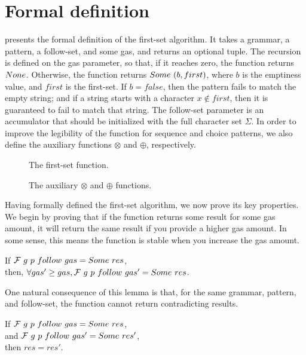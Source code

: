 \section{Formal definition}

 presents
the formal definition of the first-set algorithm.
It takes a grammar, a pattern, a follow-set,
and some gas, and returns an optional tuple.
The recursion is defined on the gas parameter,
so that, if it reaches zero,
the function returns $None$.
Otherwise, the function returns $Some\ (b, first)$,
where $b$ is the emptiness value,
and $first$ is the first-set.
If $b=false$,
then the pattern fails to match the empty string;
and if a string starts with a character
$x \notin first$,
then it is guaranteed to fail to match that string.
The follow-set parameter is an
accumulator that should be initialized with
the full character set $\Sigma$.
In order to improve the legibility
of the function for sequence and choice patterns,
we also define the auxiliary functions $\otimes$ and $\oplus$,
respectively.
\begin{figure}
    \centering
    
    \caption{The first-set function.}
    \label{fig:firstcomp}
\end{figure}
\begin{figure}
    \centering
    
    
    \caption{The auxiliary $\otimes$ and $\oplus$ functions.}
    \label{fig:firstaux}
\end{figure}

Having formally defined the first-set algorithm,
we now prove its key properties.
We begin by proving that if the function returns
some result for some gas amount,
it will return the same result if you provide
a higher gas amount.
In some sense, this means the function is stable
when you increase the gas amount.

\begin{lemma}
If $\mathcal{F}{}\ g\ p\ follow\ gas = Some\ res$, \\
then, $\forall gas' \ge gas, \mathcal{F}{}\ g\ p\ follow\ gas' = Some\ res$.
\end{lemma}

One natural consequence of this lemma is that,
for the same grammar, pattern, and follow-set,
the function cannot return contradicting results.

\begin{lemma}
If $\mathcal{F}{}\ g\ p\ follow\ gas = Some\ res$, \\
and $\mathcal{F}{}\ g\ p\ follow\ gas' = Some\ res'$, \\
then $res = res'$.
\end{lemma}

